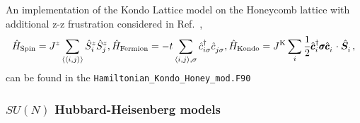 An implementation of the Kondo Lattice model on the  Honeycomb lattice with additional z-z frustration considered in Ref.~\cite{SatoT17_1}, 
\begin{equation}
\hat{H}_{\text{Spin}} = J^{z}\sum_{\langle \langle i,j \rangle \rangle}\hat{S}_{i}^{z}\hat{S}_{j}^{z},  \hfill  \hat{H}_{\text{Fermion}} = -t\sum_{\langle i,j \rangle,\sigma}\hat{c}_{i\sigma}^\dagger \hat{c}^{\phantom\dagger} _{j\sigma},  \hfill
\hat{H}_{\text{Kondo}}  =  J^{\text{K}} \sum_{i}    \frac{1}{2} \hat{\pmb{c}}^{\dagger}_{i} \pmb{\sigma}\hat{\pmb{c}}^{\phantom\dagger}_{i} \cdot \hat{{\bm S}}^{\phantom\dagger} _{i} , \hfill
\end{equation}
can be found in  the \texttt{Hamiltonian\_Kondo\_Honey\_mod.F90}

\subsubsection{$SU(N)$ Hubbard-Heisenberg models}

